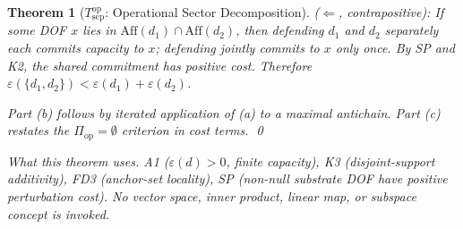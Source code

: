 \documentclass[11pt,a4paper]{article}
\newtheorem{theorem}{Theorem}[section]
\theoremstyle{definition}
\newcommand{\eps}{\varepsilon}
\begin{document}
\begin{theorem}[$T_{\mathrm{sep}}^{\mathrm{op}}$: Operational Sector Decomposition]
($\Leftarrow$, contrapositive): If some DOF $x$ lies in $\mathrm{Aff}(d_1) \cap \mathrm{Aff}(d_2)$, then defending $d_1$ and $d_2$ separately each commits capacity to $x$; defending jointly commits to $x$ only once.  By SP and K2, the shared commitment has positive cost.  Therefore $\eps(\{d_1,d_2\}) < \eps(d_1) + \eps(d_2)$.

\noindent Part (b) follows by iterated application of (a) to a maximal antichain.  Part (c) restates the $\Pi_{\mathrm{op}} = \emptyset$ criterion in cost terms.  \qed

\smallskip\noindent\textit{What this theorem uses.}  A1 ($\eps(d) > 0$, finite capacity), K3 (disjoint-support additivity), FD3 (anchor-set locality), SP (non-null substrate DOF have positive perturbation cost).  No vector space, inner product, linear map, or subspace concept is invoked.
\end{theorem}
\end{document}

